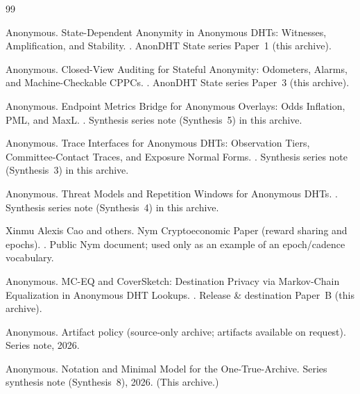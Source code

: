 \documentclass[11pt]{article}
\begin{document}
\begin{thebibliography}{99}\small

Anonymous.
\newblock State-Dependent Anonymity in Anonymous DHTs: Witnesses, Amplification, and Stability.
.
\newblock AnonDHT State series Paper~1 (this archive).

Anonymous.
\newblock Closed-View Auditing for Stateful Anonymity: Odometers, Alarms, and Machine-Checkable CPPCs.
.
\newblock AnonDHT State series Paper~3 (this archive).

Anonymous.
\newblock Endpoint Metrics Bridge for Anonymous Overlays: Odds Inflation, PML, and MaxL.
.
\newblock Synthesis series note (Synthesis~5) in this archive.

Anonymous.
\newblock Trace Interfaces for Anonymous DHTs: Observation Tiers, Committee-Contact Traces, and Exposure Normal Forms.
.
\newblock Synthesis series note (Synthesis~3) in this archive.

Anonymous.
\newblock Threat Models and Repetition Windows for Anonymous DHTs.
.
\newblock Synthesis series note (Synthesis~4) in this archive.

Xinmu Alexis Cao and others.
\newblock Nym Cryptoeconomic Paper (reward sharing and epochs).
.
\newblock Public Nym document; used only as an example of an epoch/cadence vocabulary.


Anonymous.
\newblock MC-EQ and CoverSketch: Destination Privacy via Markov-Chain Equalization in Anonymous DHT Lookups.
.
\newblock Release \& destination Paper~B (this archive).

Anonymous.
\newblock Artifact policy (source-only archive; artifacts available on request).
\newblock Series note, 2026.

Anonymous.
\newblock Notation and Minimal Model for the One-True-Archive.
\newblock Series synthesis note (Synthesis~8), 2026. (This archive.)

\end{thebibliography}
\end{document}
